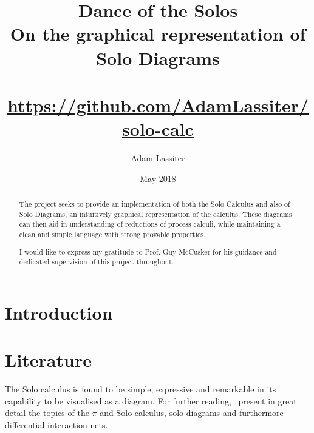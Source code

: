 \documentclass{article}
\title{Dance of the Solos \\
    \large On the graphical representation of Solo Diagrams \\~\\
    \small \url{https://github.com/AdamLassiter/solo-calc}}
\author{Adam Lassiter}
\date{May 2018}
\begin{document}
    
    \maketitle
    \vspace{\fill}
    \begin{abstract}
        The project seeks to provide an implementation of both the Solo Calculus and also of Solo Diagrams, an intuitively graphical representation of the calculus.
        These diagrams can then aid in understanding of reductions of process calculi, while maintaining a clean and simple language with strong provable properties.
    \end{abstract}
    \vspace{\fill}
    \begin{figure}[H]
        \centering
        \def\svgwidth{\columnwidth/3}
        
    \end{figure}
    \vspace{\fill}
    \pagebreak
    
    \renewcommand{\abstractname}{Acknowledgements}
    \null\vspace{\fill}
    \begin{abstract}
        I would like to express my gratitude to Prof. Guy McCusker for his guidance and dedicated supervision of this project throughout.
    \end{abstract}
    \vspace{\fill}
    \pagebreak
    
    \tableofcontents
    \pagebreak

    \section{Introduction}

    \section{Literature}
        
        
        \begin{remarks}
            The Solo calculus is found to be simple, expressive and remarkable in its capability to be visualised as a diagram.
            For further reading,~\cite{acyclic-solos} present in great detail the topics of the $\pi$ and Solo calculus, solo diagrams and furthermore differential interaction nets.
        \end{remarks}
\end{document}
